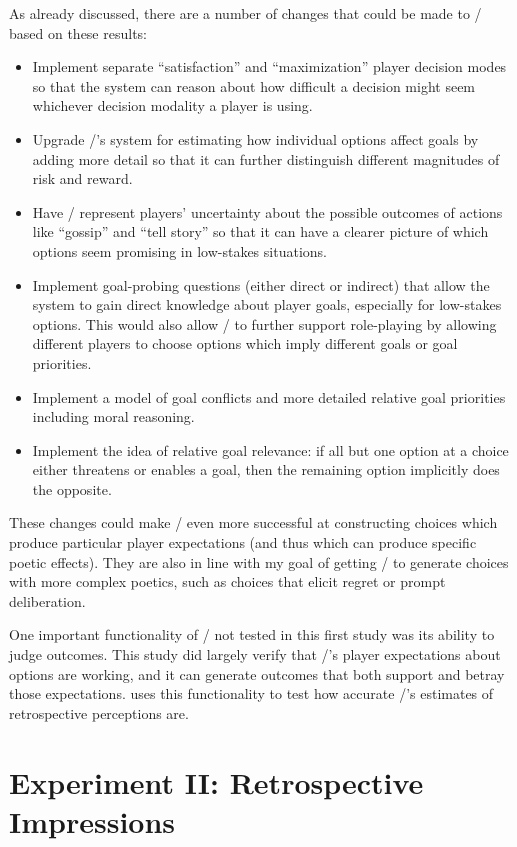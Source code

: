 As already discussed, there are a number of changes that could be made to \dunyazad/ based on these results:
%
\begin{itemize}
  \item Implement separate ``satisfaction'' and ``maximization'' player decision modes so that the system can reason about how difficult a decision might seem whichever decision modality a player is using.
  \item Upgrade \dunyazad/'s system for estimating how individual options affect goals by adding more detail so that it can further distinguish different magnitudes of risk and reward.
  \item Have \dunyazad/ represent players' uncertainty about the possible outcomes of actions like ``gossip'' and ``tell story'' so that it can have a clearer picture of which options seem promising in low-stakes situations.
  \item Implement goal-probing questions (either direct or indirect) that allow the system to gain direct knowledge about player goals, especially for low-stakes options. This would also allow \dunyazad/ to further support role-playing by allowing different players to choose options which imply different goals or goal priorities.
  \item Implement a model of goal conflicts and more detailed relative goal priorities including moral reasoning.
  \item Implement the idea of relative goal relevance: if all but one option at a choice either threatens or enables a goal, then the remaining option implicitly does the opposite.
\end{itemize}
%
These changes could make \dunyazad/ even more successful at constructing choices which produce particular player expectations (and thus which can produce specific poetic effects).
%
They are also in line with my goal of getting \dunyazad/ to generate choices with more complex poetics, such as choices that elicit regret or prompt deliberation.


One important functionality of \dunyazad/ not tested in this first study was its ability to judge outcomes.
%
This study did largely verify that \dunyazad/'s player expectations about options are working, and it can generate outcomes that both support and betray those expectations.
%
 uses this functionality to test how accurate \dunyazad/'s estimates of retrospective perceptions are.


\section{Experiment II: Retrospective Impressions}

